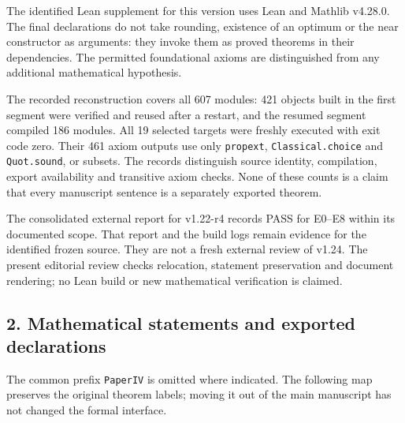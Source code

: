 \documentclass[english,11pt,a4paper]{article}
\begin{document}
The identified Lean supplement for this version uses Lean and Mathlib
v4.28.0. The final declarations do not take rounding, existence of an
optimum or the near constructor as arguments: they invoke them as proved
theorems in their dependencies. The permitted foundational axioms are
distinguished from any additional mathematical hypothesis.

The recorded reconstruction covers all 607 modules: 421 objects built in
the first segment were verified and reused after a restart, and the
resumed segment compiled 186 modules. All 19 selected targets were
freshly executed with exit code zero. Their 461 axiom outputs use only
\nolinkurl{propext}, \nolinkurl{Classical.choice} and \nolinkurl{Quot.sound}, or
subsets. The records distinguish source identity, compilation, export
availability and transitive axiom checks. None of these counts is a
claim that every manuscript sentence is a separately exported theorem.

The consolidated external report for v1.22-r4 records PASS for E0--E8
within its documented scope. That report and the build logs remain
evidence for the identified frozen source. They are not a fresh external
review of v1.24. The present editorial review checks relocation,
statement preservation and document rendering; no Lean build or new
mathematical verification is claimed.

\subsection{2. Mathematical statements and exported
declarations}\label{mathematical-statements-and-exported-declarations}

The common prefix \nolinkurl{PaperIV} is omitted where indicated. The
following map preserves the original theorem labels; moving it out of
the main manuscript has not changed the formal interface.
\end{document}
